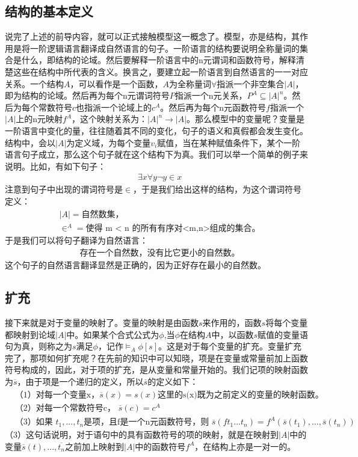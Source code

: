 \documentclass{article}
\begin{document}
\subsection{结构的基本定义 }
说完了上述的前导内容，就可以正式接触模型这一概念了。模型，亦是结构，其作用是将一阶逻辑语言翻译成自然语言的句子。一阶语言的结构要说明全称量词的集合是什么，即结构的论域。然后要解释一阶语言中的n元谓词和函数符号，解释清楚这些在结构中所代表的含义。换言之，要建立起一阶语言到自然语言的一一对应关系。一个结构$A$，可以看作是一个函数，$A$为全称量词$\forall$指派一个非空集合$|A|$，即为结构的论域。然后再为每个n元谓词符号$P$指派一个n元关系，$P^A \subseteq |A|^n$。然后为每个常数符号$c$也指派一个论域上的$c^A$。然后再为每个n元函数符号$f$指派一个$|A|$上的n元映射$f^A$，这个映射关系为：$|A|^n \rightarrow |A|$。那么模型中的变量呢？变量是一阶语言中变化的量，往往随着其不同的变化，句子的语义和真假都会发生变化。结构中，会以$|A|$为定义域，为每个变量$v_i$赋值，当在某种赋值条件下，某个一阶语言句子成立，那么这个句子就在这个结构下为真。我们可以举一个简单的例子来说明。比如，有如下句子：
\begin{align*}
    & \exists x \forall y \neg y \in x
\end{align*}
注意到句子中出现的谓词符号是$\in$，于是我们给出这样的结构，为这个谓词符号定义：
\begin{align*}
    & |A| = \text{自然数集，} \\
    & \in^A = \text{使得 m < n 的所有有序对<m,n>组成的集合。}
\end{align*}
于是我们可以将句子翻译为自然语言：
\begin{align*}
    & \text{存在一个自然数，没有比它更小的自然数。}
\end{align*}
这个句子的自然语言翻译显然是正确的，因为正好存在最小的自然数。\\

\subsection{扩充 }
接下来就是对于变量的映射了。变量的映射是由函数$s$来作用的，函数$s$将每个变量都映射到论域$|A|$中。如果某个合式公式为$\phi$,当$\phi$在结构$A$中，以函数$s$赋值的变量语句为真，则称之为$s$满足$\phi$，记作$\models_A \phi[s]$。这是对于每个变量的扩充。变量扩充完了，那项如何扩充呢？在先前的知识中可以知晓，项是在变量或常量前加上函数符号构成的，因此，对于项的扩充，是从变量和常量开始的。我们记项的映射函数为$\overline{s}$，由于项是一个递归的定义，所以$\overline{s}$的定义如下：
\begin{align*}
    & \text{（1）对每一个变量x，}\overline{s}(x)=s(x) \text{这里的s(x)既为之前定义的变量的映射函数。 }  \\
    & \text{（2）对每一个常数符号c， }\overline{s}(c)=c^A \\
    & \text{（3）如果 }t_1,...,t_n\text{是项，且f是一个n元函数符号，则 }\overline{s}(ft_1...t_n)=f^A(\overline{s}(t_1),...,\overline{s}(t_n))
\end{align*}
（3）这句话说明，对于语句中的具有函数符号的项的映射，就是在映射到$|A|$中的变量$\overline{s}(t),...,\overline{t_n}$之前加上映射到$|A|$中的函数符号$f^A$，在结构上亦是一对一的。\\
\end{document}

